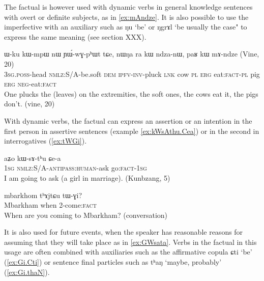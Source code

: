 \documentclass[oldfontcommands,oneside,a4paper,11pt]{article}
\newcommand{\ipa}[1]{{\phon \mbox{#1}}} %
\newcommand{\factual}[1]{\textsc{:fact}}
\begin{document}
 The factual is however used with dynamic verbs in general knowledge sentences with overt or definite subjects, as in \ref{ex:mAndze}. It is also possible to use the imperfective with an auxiliary such as \ipa{ŋu} `be' or  \ipa{ŋgrɤl} `be usually the case" to express the same meaning (see section XXX).

 

\begin{exe}
\ex \label{ex:mAndze}
\gll
   	\ipa{ɯ-ku}  	\ipa{kɯ-mpɯ}  	\ipa{nɯ}  	\ipa{ɲɯ́-wɣ-pʰɯt}  	\ipa{tɕe,}  \ipa{nɯŋa}  	\ipa{ra}  	\ipa{kɯ}  	\ipa{ndza-nɯ,}  	\ipa{paʁ}  	\ipa{kɯ}  	\ipa{mɤ-ndze}  
(Vine, 20) \\
\textsc{3sg.poss}-head \textsc{nmlz}:S/A-be.soft \textsc{dem} \textsc{ipfv-inv}-pluck \textsc{lnk} cow \textsc{pl} \textsc{erg} eat:\textsc{fact-pl} pig \textsc{erg} \textsc{neg}-eat\factual{} \\
\glt  One plucks the (leaves) on the extremities, the soft ones, the cows eat it, the pigs don't. (vine, 20)
\end{exe}

 


With dynamic verbs, the factual can express an assertion or an intention in the first person in assertive sentences (example \ref{ex:kWsAthu.Cea}) or in the second in interrogatives (\ref{ex:tWGi}).

\begin{exe}
\ex \label{ex:kWsAthu.Cea}
\gll
\ipa{aʑo}  	\ipa{kɯ-sɤ-tʰu}  	\ipa{ɕe-a}  \\
\textsc{1sg} \textsc{nmlz}:S/A-\textsc{antipass:human}-ask go\factual{}-\textsc{1sg} \\
\glt I am going to ask (a girl in marriage). (Kunbzang, 5)
\end{exe}

\begin{exe}
\ex \label{ex:tWGi}
\gll
\ipa{mbarkhom} \ipa{tʰɤjtɕu} \ipa{tɯ-ɣi}?\\
Mbarkham when 2-come\factual{} \\
\glt When are you coming to Mbarkham? (conversation)
\end{exe}

It is also used for future events, when the speaker has reasonable reasons for assuming that they will take place as in \ref{ex:GWsata}. Verbs in the factual in this usage are often combined with auxiliaries such as the affirmative copula \ipa{ɕti} `be' (\ref{ex:Gi.Cti}) or sentence final particles such as \ipa{tʰaŋ} `maybe, probably' (\ref{ex:Gi.thaN}).
\end{document}

